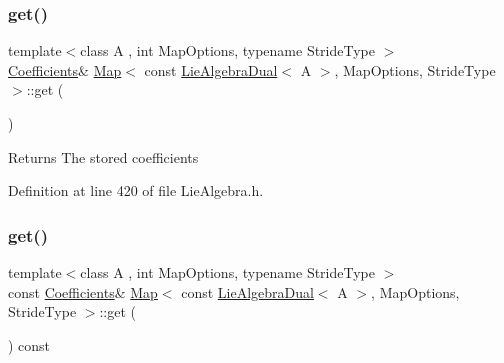 \subsubsection{\texorpdfstring{get()}{get()}\hspace{0.1cm}{\footnotesize\ttfamily [1/2]}}
{\footnotesize\ttfamily template$<$class A , int Map\+Options, typename Stride\+Type $>$ \\
\hyperlink{class_map_3_01const_01_lie_algebra_dual_3_01_a_01_4_00_01_map_options_00_01_stride_type_01_4_ae2a817b2902e4bf4f79a40724c8c9341}{Coefficients}\& \hyperlink{class_map_3_01const_01_lie_algebra_dual_3_01_a_01_4_00_01_map_options_00_01_stride_type_01_4_a3733e2160ea4f13268b2b3e34b33d7c7}{Map}$<$ const \hyperlink{class_lie_algebra_dual}{Lie\+Algebra\+Dual}$<$ A $>$, Map\+Options, Stride\+Type $>$\+::get (\begin{DoxyParamCaption}{ }\end{DoxyParamCaption})\hspace{0.3cm}{\ttfamily [inline]}}

\begin{DoxyReturn}{Returns}
The stored coefficients 
\end{DoxyReturn}


Definition at line 420 of file Lie\+Algebra.\+h.

\hypertarget{class_map_3_01const_01_lie_algebra_dual_3_01_a_01_4_00_01_map_options_00_01_stride_type_01_4_a13e7ccec6853a91e31f5f209bbb27325}{}\label{class_map_3_01const_01_lie_algebra_dual_3_01_a_01_4_00_01_map_options_00_01_stride_type_01_4_a13e7ccec6853a91e31f5f209bbb27325} 
\subsubsection{\texorpdfstring{get()}{get()}\hspace{0.1cm}{\footnotesize\ttfamily [2/2]}}
{\footnotesize\ttfamily template$<$class A , int Map\+Options, typename Stride\+Type $>$ \\
const \hyperlink{class_map_3_01const_01_lie_algebra_dual_3_01_a_01_4_00_01_map_options_00_01_stride_type_01_4_ae2a817b2902e4bf4f79a40724c8c9341}{Coefficients}\& \hyperlink{class_map_3_01const_01_lie_algebra_dual_3_01_a_01_4_00_01_map_options_00_01_stride_type_01_4_a3733e2160ea4f13268b2b3e34b33d7c7}{Map}$<$ const \hyperlink{class_lie_algebra_dual}{Lie\+Algebra\+Dual}$<$ A $>$, Map\+Options, Stride\+Type $>$\+::get (\begin{DoxyParamCaption}{ }\end{DoxyParamCaption}) const\hspace{0.3cm}{\ttfamily [inline]}}


